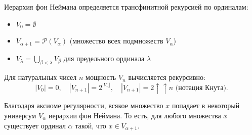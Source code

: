 \documentclass[11pt, a4paper]{extarticle}
\newcommand{\al}{\alpha}
\newcommand{\be}{\beta}
\newcommand{\la}{\lambda}
\newcommand{\Pcal}{{\mathcal P}}
\begin{document}
\begin{definition}
Иерархия фон Неймана определяется трансфинитной рекурсией по ординалам:
\begin{itemize}
    \item $V_0 = \emptyset$
    \item $V_{\al + 1} = \Pcal(V_\al)$ (множество всех подмножеств $V_\al$)
    \item $V_\la = \bigcup_{\be < \la} V_\be$ для предельного ординала $\la$
\end{itemize}

Для натуральных чисел $n$ мощность $V_n$ вычисляется рекурсивно:
$$|V_0| = 0, \quad |V_{n+1}| = 2^{|V_n|},
\quad |V_{n+1}|=2\uparrow\uparrow n\mbox{ (нотация Кнута)}.$$
\end{definition}

\begin{theorem}
Благодаря аксиоме регулярности, всякое множество $x$ попадает в некоторый универсум $V_\al$ иерархии фон Неймана. То есть, для любого множества $x$ существует ординал $\al$ такой, что $x \in V_{\al + 1}$.
\end{theorem}
\end{document}
